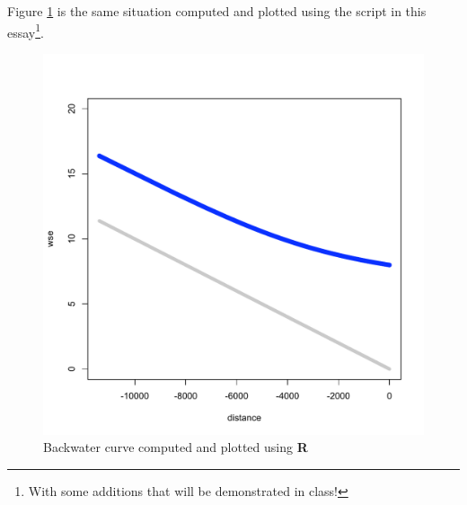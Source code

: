 Figure \ref{fig:Rplot1} is the same situation computed and plotted using the script in this essay\footnote{With some additions that will be demonstrated in class!}.

\begin{figure}[h!] %
   \centering
   \includegraphics[width=5in]{example1Rplot.pdf} 
   \caption{Backwater curve computed and plotted using \textbf{R}}
   \label{fig:Rplot1}
\end{figure}

